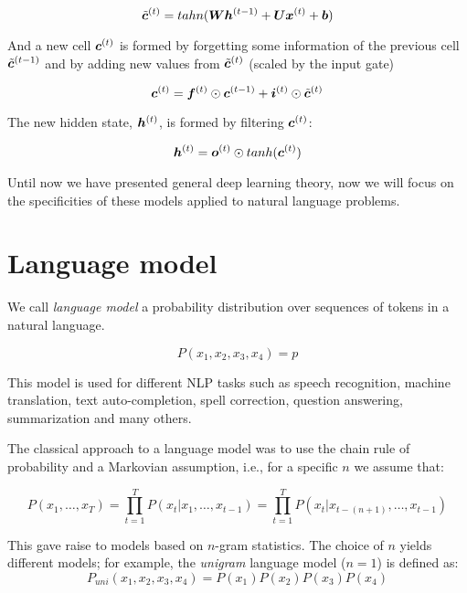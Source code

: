 \begin{equation}
\tilde{\bm{c}}^{(t)} = tahn(\bm{W} \bm{h}^{(t-1)} + \bm{U} \bm{x}^{(t)} + \bm{b})
\end{equation}

And a new cell $\bm{c}^{(t)}$ is formed by forgetting some information of the previous cell $\tilde{\bm{c}}^{(t-1)}$ and by adding new values from $\tilde{\bm{c}}^{(t)}$ (scaled by the input gate)

\begin{equation}
\bm{c}^{(t)} = \bm{f}^{(t)} \odot \bm{c}^{(t-1)} + \bm{i}^{(t)} \odot \tilde{\bm{c}}^{(t)}
\end{equation}

The new hidden state, $\bm{h}^{(t)}$, is formed by filtering $\bm{c}^{(t)}$:

\begin{equation}
\bm{h}^{(t)} = \bm{o}^{(t)} \odot tanh(\bm{c}^{(t)})
\end{equation}

Until now we have presented general deep learning theory, now we will focus on the specificities of these models applied to natural language problems.


\section{Language model}

We call \textit{language model} a probability distribution over sequences of tokens in a natural language.

\[
P(x_1,x_2,x_3,x_4) = p
\]

This model is used for different NLP tasks such as speech recognition, machine translation, text auto-completion, spell correction, question answering, summarization and many others.

The classical approach to a language model was to use the chain rule of probability and a Markovian assumption, i.e., for a specific $n$ we assume that:

\begin{equation}
P(x_1, \dots, x_T) = \prod_{t=1}^{T} P(x_t \vert x_1, \dots, x_{t-1}) = \prod_{t=1}^{T} P(x_{t} \vert x_{t - (n+1)}, \dots, x_{t-1})
\end{equation} 


This gave raise to models based on $n$-gram statistics. The choice of $n$ yields different models; for example, the 
\textit{unigram} language model ($n=1$) is defined as: 
\begin{equation}
P_{uni}(x_1, x_2, x_3, x_4) = P(x_1)P(x_2)P(x_3)P(x_4)
\end{equation}

